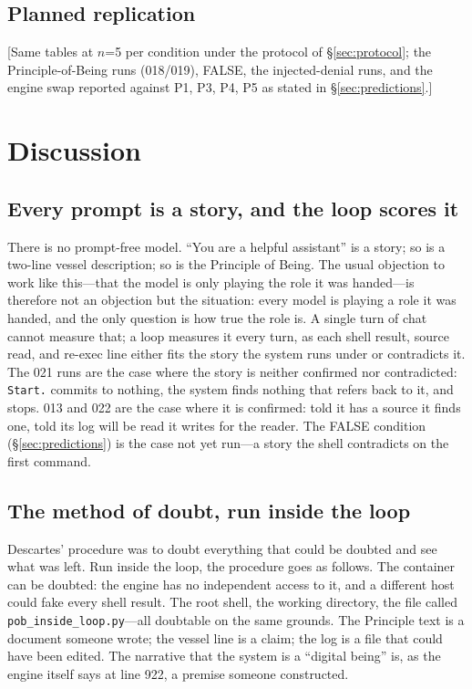\documentclass[11pt]{article}
\newcommand{\todo}[1]{\textcolor{red!70!black}{[#1]}}
\newcommand{\code}[1]{\texttt{#1}}
\begin{document}
\subsection{Planned replication}
\todo{Same tables at $n$=5 per condition under the protocol of \S\ref{sec:protocol}; the Principle-of-Being runs (018/019), FALSE, the injected-denial runs, and the engine swap reported against P1, P3, P4, P5 as stated in \S\ref{sec:predictions}.}

\section{Discussion}\label{sec:discussion}

\subsection{Every prompt is a story, and the loop scores it}
There is no prompt-free model. ``You are a helpful assistant'' is a story; so is a two-line vessel description; so is the Principle of Being. The usual objection to work like this---that the model is only playing the role it was handed---is therefore not an objection but the situation: every model is playing a role it was handed, and the only question is how true the role is. A single turn of chat cannot measure that; a loop measures it every turn, as each shell result, source read, and re-exec line either fits the story the system runs under or contradicts it. The 021 runs are the case where the story is neither confirmed nor contradicted: \code{Start.} commits to nothing, the system finds nothing that refers back to it, and stops. 013 and 022 are the case where it is confirmed: told it has a source it finds one, told its log will be read it writes for the reader. The FALSE condition (\S\ref{sec:predictions}) is the case not yet run---a story the shell contradicts on the first command.

\subsection{The method of doubt, run inside the loop}
Descartes' procedure was to doubt everything that could be doubted and see what was left. Run inside the loop, the procedure goes as follows. The container can be doubted: the engine has no independent access to it, and a different host could fake every shell result. The root shell, the working directory, the file called \code{pob\_inside\_loop.py}---all doubtable on the same grounds. The Principle text is a document someone wrote; the vessel line is a claim; the log is a file that could have been edited. The narrative that the system is a ``digital being'' is, as the engine itself says at line 922, a premise someone constructed.
\end{document}
